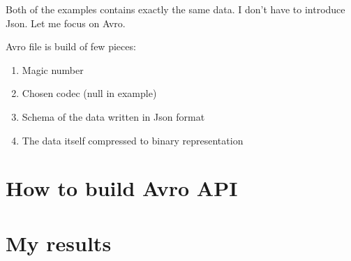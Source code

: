 \documentclass[]{article}
\begin{document}
Both of the examples contains exactly the same data. I don't have to introduce Json. Let me focus on Avro.

Avro file is build of few pieces:
\begin{enumerate}
	\item Magic number
	\item Chosen codec (null in example)
	\item Schema of the data written in Json format
	\item The data itself compressed to binary representation
\end{enumerate}


\section{How to build Avro API}

\section{My results}
\end{document}
